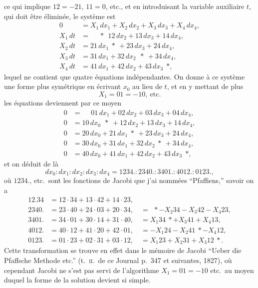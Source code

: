 \documentclass[11pt]{article}
\begin{document}
\noindent ce qui implique $12 = -21$, $11 = 0$, etc., et en introduisant la variable auxiliaire $t$, qui doit \^etre \'elimin\'ee, le syst\`eme est
\[
\begin{aligned}
0 &= X_1\, dx_1 + X_2\, dx_2 + X_3\, dx_3 + X_4\, dx_4,\\
X_1\, dt &= \phantom{*}\ \ {} * \ \ 12\, dx_2 + 13\, dx_3 + 14\, dx_4,\\
X_2\, dt &= 21\, dx_1 \ {} * \ {} + 23\, dx_3 + 24\, dx_4,\\
X_3\, dt &= 31\, dx_1 + 32\, dx_2 \ \ {} * \ {} + 34\, dx_4,\\
X_4\, dt &= 41\, dx_1 + 42\, dx_2 + 43\, dx_3 \ \ {} *,
\end{aligned}
\]
lequel ne contient que quatre \'equations ind\'ependantes. On donne \`a ce syst\`eme une forme plus sym\'etrique en \'ecrivant $x_0$ au lieu de $t$, et en y mettant de plus
\[
X_1 = 01 = -10,\ \text{etc.}
\]
les \'equations deviennent par ce moyen
\[
\begin{aligned}
0 &= \phantom{*}\ \ 01\, dx_1 + 02\, dx_2 + 03\, dx_3 + 04\, dx_4,\\
0 &= 10\, dx_0 \ \ {} * \ {} + 12\, dx_2 + 13\, dx_3 + 14\, dx_4,\\
0 &= 20\, dx_0 + 21\, dx_1 \ {} * \ {} + 23\, dx_3 + 24\, dx_4,\\
0 &= 30\, dx_0 + 31\, dx_1 + 32\, dx_2 \ {} * \ {} + 34\, dx_4,\\
0 &= 40\, dx_0 + 41\, dx_1 + 42\, dx_2 + 43\, dx_3 \ \ {} *,
\end{aligned}
\]
et on d\'eduit de l\`a
\[
dx_0 : dx_1 : dx_2 : dx_3 : dx_4 = 1234. : 2340. : 3401. : 4012. : 0123.,
\]
o\`u $1234.$, etc.\ sont les fonctions de Jacobi que j'ai nomm\'ees ``Pfaffiens,'' savoir on a
\[
\begin{aligned}
12.34 &= 12 \cdot 34 + 13 \cdot 42 + 14 \cdot 23,\\
2340. &= 23 \cdot 40 + 24 \cdot 03 + 20 \cdot 34, \quad = \ \ {} * - X_2 34 - X_3 42 - X_4 23,\\
3401. &= 34 \cdot 01 + 30 \cdot 14 + 31 \cdot 40, \quad = X_1 34 \ {} * + X_3 41 + X_4 13,\\
4012. &= 40 \cdot 12 + 41 \cdot 20 + 42 \cdot 01, \quad = -X_1 24 - X_2 41 \ {} * - X_4 12,\\
0123. &= 01 \cdot 23 + 02 \cdot 31 + 03 \cdot 12, \quad = X_1 23 + X_2 31 + X_3 12 \ {} * .
\end{aligned}
\]
Cette transformation se trouve en effet dans le m\'emoire de Jacobi ``Ueber die Pfaffsche Methode etc.'' (t.~\textsc{ii}.\ de ce Journal p.~347 et suivantes, 1827), o\`u cependant Jacobi ne s'est pas servi de l'algorithme $X_1 = 01 = -10$ etc.\ au moyen duquel la forme de la solution devient si simple.
\end{document}
